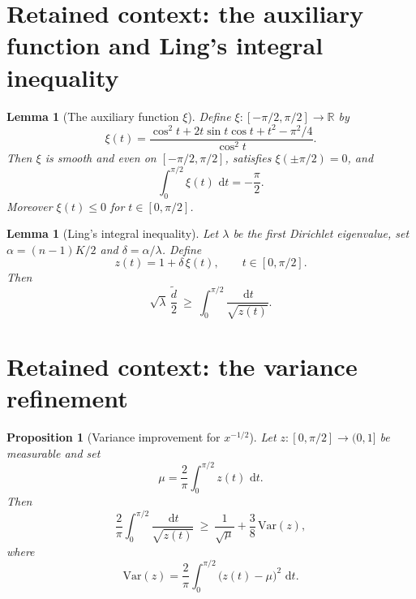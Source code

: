 \documentclass[10pt,a4paper]{amsart}
\newcommand{\Var}{\mathrm{Var}}
\newcommand{\dd}{\,\mathrm{d}}
\newcommand{\de}{\tilde d}
\theoremstyle{plain}
\newtheorem{lemma}[theorem]{Lemma}
\newtheorem{proposition}[theorem]{Proposition}
\theoremstyle{remark}
\begin{document}
\section*{Retained context: the auxiliary function and Ling's integral inequality}

\begin{lemma}[The auxiliary function $\xi$]
\label{lem:xi}
Define $\xi:[-\pi/2,\pi/2]\to\mathbb{R}$ by
\begin{equation}
\label{eq:xi-def}
\xi(t)=\frac{\cos^2 t + 2t\sin t\cos t + t^2 - \pi^2/4}{\cos^2 t}.
\end{equation}
Then $\xi$ is smooth and even on $[-\pi/2,\pi/2]$, satisfies $\xi(\pm \pi/2)=0$, and
\begin{equation}
\label{eq:xi-mean}
\int_{0}^{\pi/2}\xi(t)\,\dd t = -\frac{\pi}{2}.
\end{equation}
Moreover $\xi(t)\le 0$ for $t\in[0,\pi/2]$.
\end{lemma}


\begin{lemma}[Ling's integral inequality]
\label{lem:ling-integral}
Let $\lambda$ be the first Dirichlet eigenvalue, set $\alpha=(n-1)K/2$ and $\delta=\alpha/\lambda$.
Define
\begin{equation}
\label{eq:z-def}
z(t)=1+\delta\,\xi(t),
\qquad t\in[0,\pi/2].
\end{equation}
Then
\begin{equation}
\label{eq:ling-star}
\sqrt{\lambda}\,\frac{\de}{2}\ \ge\ \int_{0}^{\pi/2}\frac{\dd t}{\sqrt{z(t)}}.
\end{equation}
\end{lemma}


\section*{Retained context: the variance refinement}

\begin{proposition}[Variance improvement for $x^{-1/2}$]
\label{prop:variance}
Let $z:[0,\pi/2]\to(0,1]$ be measurable and set
\begin{equation}
\mu = \frac{2}{\pi}\int_{0}^{\pi/2} z(t)\,\dd t.
\end{equation}
Then
\begin{equation}
\label{eq:variance-ineq}
\frac{2}{\pi}\int_{0}^{\pi/2}\frac{\dd t}{\sqrt{z(t)}}
\ \ge\
\frac{1}{\sqrt{\mu}}+\frac{3}{8}\,\Var(z),
\end{equation}
where
\begin{equation}
\Var(z)=\frac{2}{\pi}\int_{0}^{\pi/2}\bigl(z(t)-\mu\bigr)^2\,\dd t.
\end{equation}
\end{proposition}
\end{document}
